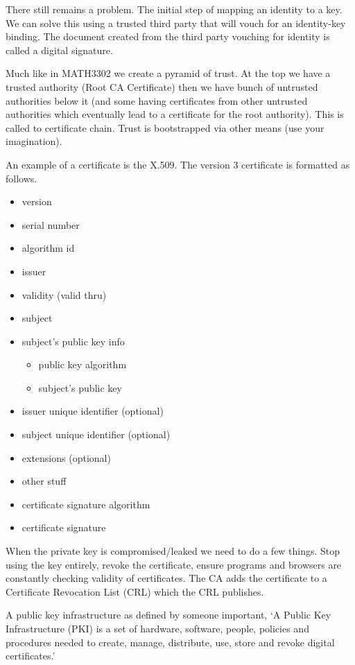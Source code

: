 \documentclass{report}
\begin{document}
There still remains a problem. The initial step of mapping an identity to a key.
We can solve this using a trusted third party that will vouch for an
identity-key binding. The document created from the third party vouching for
identity is called a digital signature.

Much like in MATH3302 we create a pyramid of trust. At the top we have a trusted
authority (Root CA Certificate) then we have bunch of untrusted authorities
below it (and some having certificates from other untrusted authorities which
eventually lead to a certificate for the root authority). This is called to
certificate chain. Trust is bootstrapped via other means (use your imagination).

An example of a certificate is the X.509. The version 3 certificate is formatted
as follows.
\begin{itemize}
    \item version
    \item serial number
    \item algorithm id
    \item issuer
    \item validity (valid thru)
    \item subject
    \item subject's public key info
        \begin{itemize}
            \item public key algorithm
            \item subject's public key
        \end{itemize}
    \item issuer unique identifier (optional)
    \item subject unique identifier (optional)
    \item extensions (optional)
    \item other stuff
    \item certificate signature algorithm
    \item certificate signature
\end{itemize}

When the private key is compromised/leaked we need to do a few things.
Stop using the key entirely, revoke the certificate, ensure programs and
browsers are constantly checking validity of certificates.
The CA adds the certificate to a Certificate Revocation List (CRL) which the CRL
publishes.

A public key infrastructure as defined by someone important,
`A Public Key Infrastructure (PKI) is a set of hardware, software, people,
policies and procedures needed to create, manage, distribute, use, store and
revoke digital certificates.'
\end{document}
